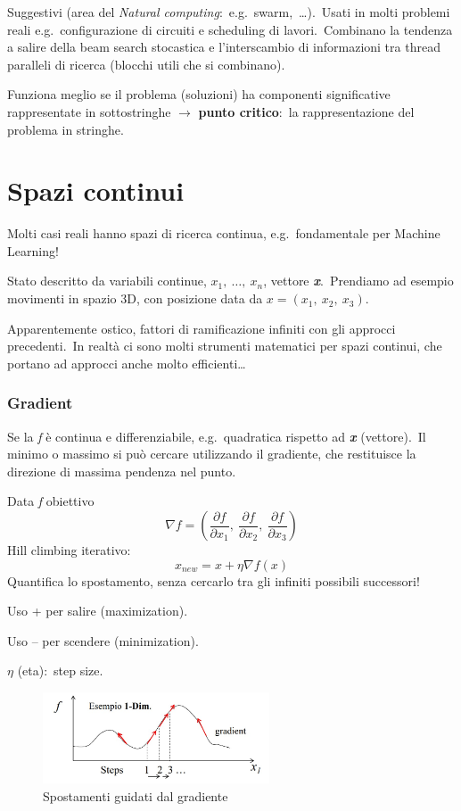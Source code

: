 \noindent Suggestivi (area del \textit{Natural computing}:\ e.g.\ swarm,\ \dots).\
Usati in molti problemi reali e.g.\ configurazione di circuiti e scheduling di lavori.\
Combinano la tendenza a salire della beam search stocastica e l'interscambio di informazioni tra thread paralleli di ricerca (blocchi utili che si combinano).\

Funziona meglio se il problema (soluzioni) ha componenti significative rappresentate in sottostringhe $\rightarrow$ \textbf{punto critico}:\ la rappresentazione del problema in stringhe.

\section{Spazi continui}

Molti casi reali hanno spazi di ricerca continua, e.g.\ fondamentale per Machine Learning!\

Stato descritto da variabili continue, $x_1,\ \dots,\ x_n$, vettore \textbf{\textit{x}}.\
Prendiamo ad esempio movimenti in spazio 3D, con posizione data da $x=(x_1,\ x_2,\ x_3)$.\

Apparentemente ostico, fattori di ramificazione infiniti con gli approcci precedenti.\
In realtà ci sono molti strumenti matematici per spazi continui, che portano ad approcci anche molto efficienti\dots

\subsubsection{Gradient}

Se la \textit{f} è continua e differenziabile, e.g.\ quadratica rispetto ad \textbf{\textit{x}} (vettore).\
Il minimo o massimo si può cercare utilizzando il gradiente, che restituisce la direzione di massima pendenza nel punto.\

\noindent Data \textit{f} obiettivo
\[
	\nabla f = \left( \frac{\partial f}{\partial x_1},\ \frac{\partial f}{\partial x_2},\ \frac{\partial f}{\partial x_3} \right)
\]
Hill climbing iterativo:
\[
	x_{new} = x + \eta\nabla f\left(x\right)
\]
Quantifica lo spostamento, senza cercarlo tra gli infiniti possibili successori!\

Uso + per salire (maximization).

Uso – per scendere (minimization).

$\eta$ (eta):\ step size.

\begin{figure}[H]
	\centering
	\includegraphics[width=0.6\textwidth]{immagini/Gradient.jpg}
	\caption*{Spostamenti guidati dal gradiente}
\end{figure}

